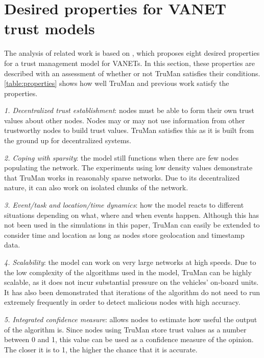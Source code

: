 
\section{Desired properties for VANET trust models}
\label{section:properties}

The analysis of related work is based on \cite{zhang2011survey}, which proposes eight desired properties for a trust management model for VANETs.
In this section, these properties are described with an assessment of whether or not TruMan satisfies their conditions.
\autoref{table:properties} shows how well TruMan and previous work satisfy the properties.

\textit{1. Decentralized trust establishment}: nodes must be able to form their own trust values about other nodes.
Nodes may or may not use information from other trustworthy nodes to build trust values.
TruMan satisfies this as it is built from the ground up for decentralized systems.

\textit{2. Coping with sparsity}: the model still functions when there are few nodes populating the network.
The experiments using low density values demonstrate that TruMan works in reasonably sparse networks.
Due to its decentralized nature, it can also work on isolated chunks of the network.

\textit{3. Event/task and location/time dynamics}: how the model reacts to different situations depending on what, where and when events happen.
Although this has not been used in the simulations in this paper, TruMan can easily be extended to consider time and location as long as nodes store geolocation and timestamp data.

\textit{4. Scalability}: the model can work on very large networks at high speeds.
Due to the low complexity of the algorithms used in the model, TruMan can be highly scalable, as it does not incur substantial pressure on the vehicles' on-board units.
It has also been demonstrated that iterations of the algorithm do not need to run extremely frequently in order to detect malicious nodes with high accuracy.

\textit{5. Integrated confidence measure}: allows nodes to estimate how useful the output of the algorithm is.
Since nodes using TruMan store trust values as a number between 0 and 1, this value can be used as a confidence measure of the opinion.
The closer it is to 1, the higher the chance that it is accurate.


